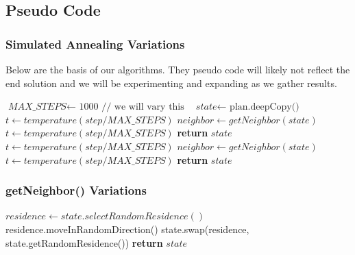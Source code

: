 \documentclass{article}
\begin{document}
\subsection{Pseudo Code}

\subsubsection{Simulated Annealing Variations}
Below are the basis of our algorithms. They pseudo code will likely not reflect the end solution and we will be experimenting and expanding as we gather results.
\\
    \begin{algorithmic}
        \State $\textit{MAX\_STEPS} \gets \text{ 1000 // we will vary this }$
        \State $\textit{state} \gets \text{ plan.deepCopy() }$\\
                \State $t \gets temperature(step/MAX\_STEPS)$
                \State $neighbor \gets getNeighbor(state)$
                    \State $t \gets temperature(step/MAX\_STEPS)$
                \EndIf
            \EndFor
            \State \textbf{return} $state$
            \EndProcedure
            \\
                \State $t \gets temperature(step/MAX\_STEPS)$
                \State $neighbor \gets getNeighbor(state)$
                    \State $t \gets temperature(step/MAX\_STEPS)$
                \EndIf
            \EndFor
            \State \textbf{return} $state$
            \EndProcedure
    \end{algorithmic}

\subsubsection{getNeighbor() Variations}
    \begin{algorithmic}
            \State $residence \gets state.selectRandomResidence()$
               \State residence.moveInRandomDirection()
            \Else
                \State state.swap(residence, state.getRandomResidence())
            \EndIf
            \State \textbf{return} $state$
            \EndProcedure
    \end{algorithmic}
\end{document}
